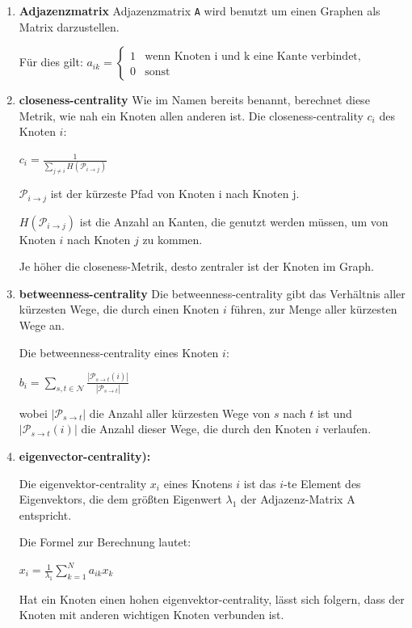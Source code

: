 \documentclass[sigconf, nonacm, review]{acmart}
\begin{document}
\begin{enumerate}
    \item \textbf{Adjazenzmatrix}
    Adjazenzmatrix \texttt{A} wird benutzt um einen Graphen als Matrix darzustellen.

    Für dies gilt: $a_{ik} = \begin{cases} 1 & \text{wenn Knoten i und k eine Kante verbindet}, \\ 0 & \text{sonst} \end{cases}$ 

    \item \textbf{closeness-centrality}
    Wie im Namen bereits benannt, berechnet diese Metrik, wie nah ein Knoten allen anderen ist.
    Die closeness-centrality $c_i$ des Knoten $i$:
    \begin{center}
        $c_i = \frac{1}{\sum_{j\neq i} H(\mathcal{P}_{i\rightarrow j})}$
    \end{center}
    $\mathcal{P}_{i\rightarrow j}$ ist der kürzeste Pfad von Knoten i nach Knoten j.
    
    $H(\mathcal{P}_{i\rightarrow j})$ ist die Anzahl an Kanten, die genutzt werden müssen, um von Knoten $i$ nach Knoten $j$ zu kommen.
    
    Je höher die closeness-Metrik, desto zentraler ist der Knoten im Graph. 
    
    \item \textbf{betweenness-centrality}
    Die betweenness-centrality gibt das Verhältnis aller kürzesten Wege, die durch einen Knoten $i$ führen, zur Menge aller kürzesten Wege an.
    
    Die betweenness-centrality eines Knoten $i$:
    \begin{center}
        $b_i = \sum_{s,t\in \mathcal{N}} \frac{|\mathcal{P}_{s\rightarrow t}(i)|}{|\mathcal{P}_{s\rightarrow t}|}$    
    \end{center}
    wobei $|\mathcal{P}_{s\rightarrow t}|$ die Anzahl aller kürzesten Wege von $s$ nach $t$ ist und $|\mathcal{P}_{s\rightarrow t}(i)|$ die Anzahl dieser Wege, die durch den Knoten $i$ verlaufen. 
    
     
    \item \textbf{eigenvector-centrality):}
     
     Die eigenvektor-centrality $x_i$ eines Knotens $i$ ist das $i$-te Element des Eigenvektors, die dem größten Eigenwert $\lambda_1$ der Adjazenz-Matrix A entspricht.
     
     Die Formel zur Berechnung lautet:
     \begin{center}
     $x_i = \frac{1}{\lambda_1}\sum^N_{k=1}a_{ik}x_k$
     \end{center}
     
     Hat ein Knoten einen hohen eigenvektor-centrality, lässt sich folgern, dass der Knoten mit anderen wichtigen Knoten verbunden ist.

\end{enumerate}
\end{document}
